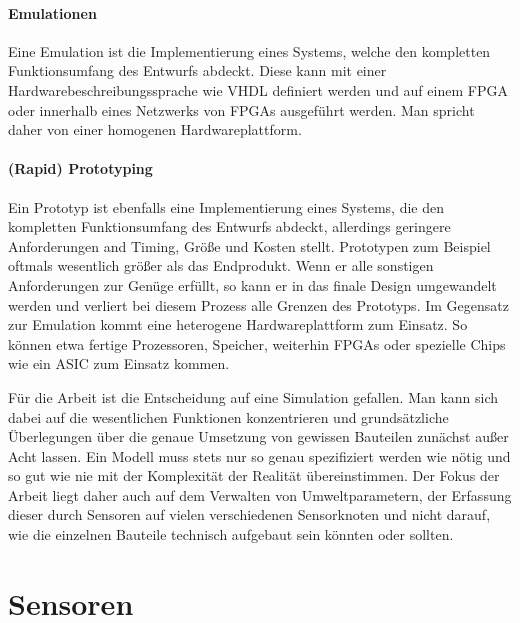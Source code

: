 \paragraph{Emulationen}

Eine Emulation ist die Implementierung eines Systems, welche den kompletten Funktionsumfang des Entwurfs abdeckt. Diese kann mit einer Hardwarebeschreibungssprache wie VHDL definiert werden und auf einem FPGA oder innerhalb eines Netzwerks von FPGAs ausgeführt werden. Man spricht daher von einer homogenen Hardwareplattform.

\paragraph{(Rapid) Prototyping}

Ein Prototyp ist ebenfalls eine Implementierung eines Systems, die den kompletten Funktionsumfang des Entwurfs abdeckt, allerdings geringere Anforderungen and Timing, Größe und Kosten stellt. Prototypen zum Beispiel oftmals wesentlich größer als das Endprodukt. Wenn er alle sonstigen Anforderungen zur Genüge erfüllt, so kann er in das finale Design umgewandelt werden und verliert bei diesem Prozess alle Grenzen des Prototyps. Im Gegensatz zur Emulation kommt eine heterogene Hardwareplattform zum Einsatz. So können etwa fertige Prozessoren, Speicher, weiterhin FPGAs oder spezielle Chips wie ein ASIC zum Einsatz kommen.

\endgraf

Für die Arbeit ist die Entscheidung auf eine Simulation gefallen. Man kann sich dabei auf die wesentlichen Funktionen konzentrieren und grundsätzliche Überlegungen über die genaue Umsetzung von gewissen Bauteilen zunächst außer Acht lassen. Ein Modell muss stets nur so genau spezifiziert werden wie nötig und so gut wie nie mit der Komplexität der Realität übereinstimmen. \newline
Der Fokus der Arbeit liegt daher auch auf dem Verwalten von Umweltparametern, der Erfassung dieser durch Sensoren auf vielen verschiedenen Sensorknoten und nicht darauf, wie die einzelnen Bauteile technisch aufgebaut sein könnten oder sollten. 



\section{Sensoren}

